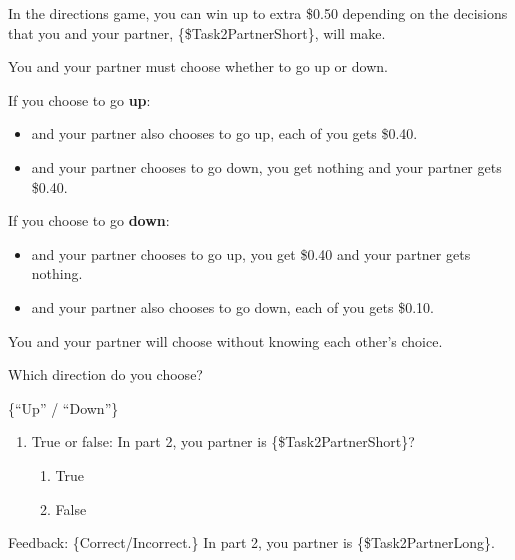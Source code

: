\begin{description}[listparindent = 1.5em]
    \item[Directions game:] \hspace{1cm} 
    
    In the directions game, you can win up to extra \$0.50 depending on the
    decisions that you and your partner, \{\$Task2PartnerShort\}, will make. 
    
    You and
    your partner must choose whether to go up or down. 
    
    If you choose to go \textbf{up}:
    
    \begin{itemize}
    	\item and your partner also chooses to go up, each of you gets \$0.40.
    	\item and your partner chooses to go down, you get nothing and your
    partner gets \$0.40.
    \end{itemize}

    If you choose to go \textbf{down}:
    
    \begin{itemize}
    	\item and your partner chooses to go up, you get \$0.40 and your partner
    gets nothing.
    	\item and your partner also chooses to go down, each of you gets \$0.10.
    \end{itemize}

    You and your partner will choose without knowing each other's choice.

    Which direction do you choose? 
    
    \{``Up'' / ``Down''\}

    \item[Part 2 Quiz Question 1] \hspace{1cm}
    \begin{enumerate}
        \item True or false: In part 2, you partner is
        \{\$Task2PartnerShort\}?
        \begin{enumerate}
            \item True
            \item False
        \end{enumerate}
    \end{enumerate}

    Feedback: \{Correct/Incorrect.\} In part 2, you partner is
    \{\$Task2PartnerLong\}.


\end{description}
